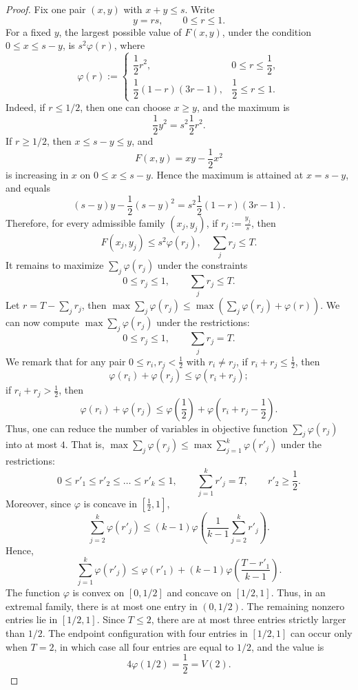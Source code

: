 \documentclass[runningheads,envcountsame,a4paper]{llncs}
\begin{document}
\begin{proof}
Fix one pair \((x,y)\) with $x+y\le s$. Write
\[
y=rs,
\qquad 0\le r\le 1.
\]
For a fixed \(y\), the largest possible value of \(F(x,y)\), under the condition
\(0\le x\le s-y\), is $s^2\varphi(r)$, where
\[
\varphi(r):=
\begin{cases}
\dfrac12r^2, & 0\le r\le \dfrac12,\\[6pt]
\dfrac12(1-r)(3r-1), & \dfrac12\le r\le 1.
\end{cases}
\]
Indeed, if \(r\le 1/2\), then one can choose \(x\ge y\), and the maximum is
\[
\frac12y^2=s^2\frac12r^2.
\]
If \(r\ge 1/2\), then \(x\le s-y\le y\), and
\[
F(x,y)=xy-\frac12x^2
\]
is increasing in \(x\) on \(0\le x\le s-y\).  Hence the maximum is attained at
\(x=s-y\), and equals
\[
(s-y)y-\frac12(s-y)^2
=
s^2\frac12(1-r)(3r-1).
\]
Therefore, for every admissible family \((x_j,y_j)\), if $r_j:=\frac{y_j}{s}$, then
\[
F(x_j,y_j)\le s^2\varphi(r_j),\quad\sum_j r_j\le T.
\]
It remains to maximize $\sum_j\varphi(r_j)$ under the constraints
\[
0\le r_j\le 1,
\qquad
\sum_j r_j\le T.
\]
Let $r=T-\sum_jr_j$, then $\max \sum_j\varphi(r_j) \leq \max (\sum_j\varphi(r_j)+\varphi(r))$. We can now compute $ \max \sum_j\varphi(r_j)$ under the restrictions:
\[
0\le r_j\le 1,
\qquad
\sum_j r_j= T.
\]
We remark that for any pair $0 \le r_i, r_j<\frac{1}{2}$ with $r_i \ne r_j$, if $r_i+r_j \leq \frac{1}{2}$, then $$\varphi(r_i)+\varphi(r_j) \leq \varphi(r_i+r_j);$$ if $r_i+r_j > \frac{1}{2}$, then $$\varphi(r_i)+\varphi(r_j) \leq \varphi(\frac{1}{2})+ \varphi(r_i+r_j-\frac{1}{2}).$$ Thus, one can reduce the number of variables in objective function $\sum_j\varphi(r_j)$ into at most $4$. That is, $\max \sum_j\varphi(r_j) \le \max \sum_{j=1}^k\varphi(r'_j)$ under the restrictions: 
\[
0\le r'_1 \le r'_2 \le \ldots \le r'_k\le 1
,\qquad
\sum_{j=1}^k r'_j= T
,\qquad r'_2 \ge \frac{1}{2}.
\]
Moreover, since $\varphi$ is concave in $[\frac{1}{2},1]$, 
$$\sum_{j=2}^k\varphi(r'_j) \leq (k-1)\varphi(\frac{1}{k-1}\sum_{j=2}^kr'_j).$$
Hence, $$\sum_{j=1}^k\varphi(r'_j) \leq \varphi(r'_1)+(k-1)\varphi(\frac{T-r'_1}{k-1}).$$
\iffalse
The function \(\varphi\) is convex on \([0,1/2]\) and concave on \([1/2,1]\).
Thus, in an extremal family, there is at most one entry in \((0,1/2)\).  The
remaining nonzero entries lie in \([1/2,1]\).  Since \(T\le 2\), there are at
most three entries strictly larger than \(1/2\).  The endpoint configuration
with four entries in \([1/2,1]\) can occur only when \(T=2\), in which case all
four entries are equal to \(1/2\), and the value is
\[
4\varphi(1/2)=\frac12=V(2).
\]


\end{proof}
\end{document}

